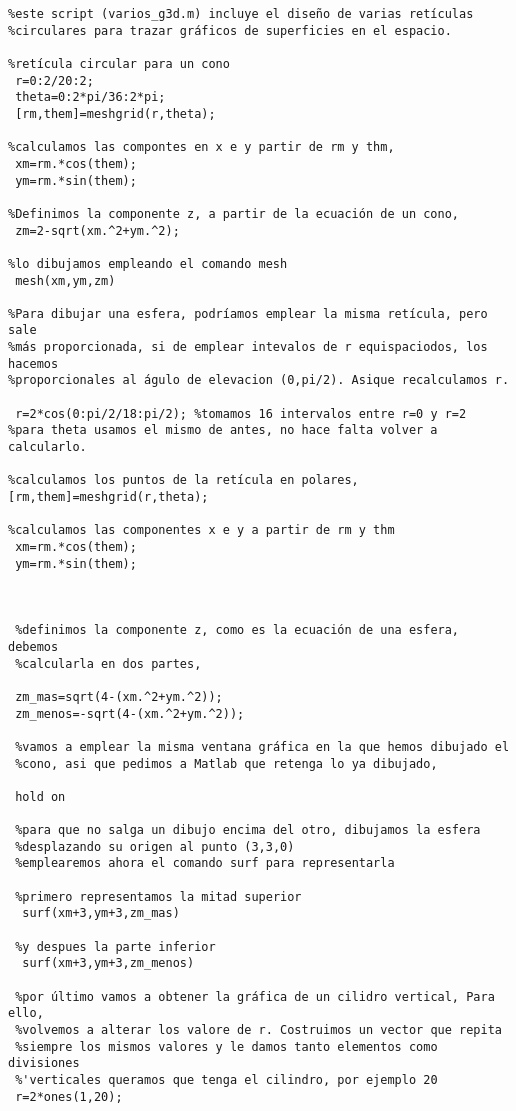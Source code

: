 \begin{verbatim}
%este script (varios_g3d.m) incluye el diseño de varias retículas
%circulares para trazar gráficos de superficies en el espacio.

%retícula circular para un cono
 r=0:2/20:2;
 theta=0:2*pi/36:2*pi;
 [rm,them]=meshgrid(r,theta);
 
%calculamos las compontes en x e y partir de rm y thm,
 xm=rm.*cos(them);
 ym=rm.*sin(them);
 
%Definimos la componente z, a partir de la ecuación de un cono,
 zm=2-sqrt(xm.^2+ym.^2);

%lo dibujamos empleando el comando mesh
 mesh(xm,ym,zm)
 
%Para dibujar una esfera, podríamos emplear la misma retícula, pero sale
%más proporcionada, si de emplear intevalos de r equispaciodos, los hacemos
%proporcionales al águlo de elevacion (0,pi/2). Asique recalculamos r.

 r=2*cos(0:pi/2/18:pi/2); %tomamos 16 intervalos entre r=0 y r=2
%para theta usamos el mismo de antes, no hace falta volver a calcularlo.

%calculamos los puntos de la retícula en polares,
[rm,them]=meshgrid(r,theta);

%calculamos las componentes x e y a partir de rm y thm
 xm=rm.*cos(them);
 ym=rm.*sin(them);
 
 
 
 %definimos la componente z, como es la ecuación de una esfera, debemos
 %calcularla en dos partes,
 
 zm_mas=sqrt(4-(xm.^2+ym.^2));
 zm_menos=-sqrt(4-(xm.^2+ym.^2));
 
 %vamos a emplear la misma ventana gráfica en la que hemos dibujado el
 %cono, asi que pedimos a Matlab que retenga lo ya dibujado,
 
 hold on
 
 %para que no salga un dibujo encima del otro, dibujamos la esfera
 %desplazando su origen al punto (3,3,0)
 %emplearemos ahora el comando surf para representarla
 
 %primero representamos la mitad superior
  surf(xm+3,ym+3,zm_mas)
 
 %y despues la parte inferior
  surf(xm+3,ym+3,zm_menos)
  
 %por último vamos a obtener la gráfica de un cilidro vertical, Para ello,
 %volvemos a alterar los valore de r. Costruimos un vector que repita
 %siempre los mismos valores y le damos tanto elementos como divisiones
 %'verticales queramos que tenga el cilindro, por ejemplo 20
 r=2*ones(1,20); 
 

\end{verbatim}
